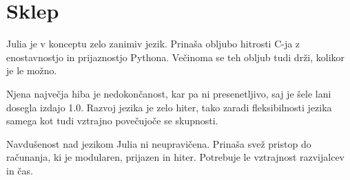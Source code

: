 \documentclass[journal,a4paper,twoside]{sty/IEEEtran}
\begin{document}
\section{Sklep}

Julia je v konceptu zelo zanimiv jezik.
Prinaša obljubo hitrosti C-ja z enostavnostjo in prijaznostjo Pythona.
Večinoma se teh obljub tudi drži, kolikor je le možno.

Njena največja hiba je nedokončanost, kar pa ni presenetljivo, saj je šele lani dosegla izdajo 1.0.
Razvoj jezika je zelo hiter, tako zaradi fleksibilnosti jezika samega kot tudi vztrajno povečujoče se skupnosti.

Navdušenost nad jezikom Julia ni neupravičena.
Prinaša svež pristop do računanja, ki je modularen, prijazen in hiter.
Potrebuje le vztrajnost razvijalcev in čas.
\end{document}
